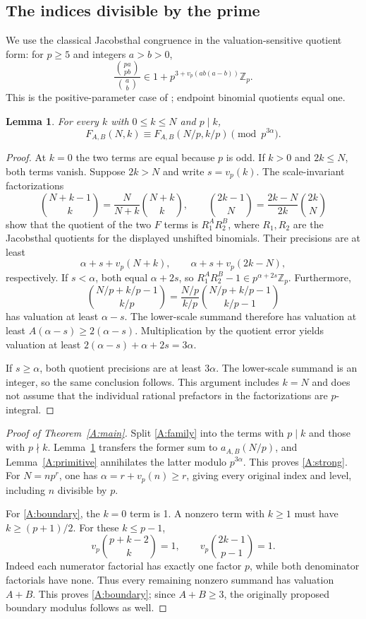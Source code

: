 \documentclass[11pt,a4paper]{article}
\newtheorem{lemma}[theorem]{Lemma}
\theoremstyle{remark}\newtheorem{remark}[theorem]{Remark}
\newcommand{\vp}{v_p}\newcommand{\Zp}{\mathbb Z_p}
\numberwithin{equation}{section}
\begin{document}
\subsection{The indices divisible by the prime}
We use the classical Jacobsthal congruence in the valuation-sensitive
quotient form: for $p\ge5$ and integers $a>b>0$,
\begin{equation}\label{A:jac}
\frac{\binom{pa}{pb}}{\binom ab}
\in1+p^{3+\vp(ab(a-b))}\Zp.
\end{equation}
This is the positive-parameter case of \cite[Lemma 5.1]{A:Straub};
endpoint binomial quotients equal one.

\begin{lemma}\label{A:divisible}
For every $k$ with $0\le k\le N$ and $p\mid k$,
\[
F_{A,B}(N,k)\equiv F_{A,B}(N/p,k/p)\pmod{p^{3\alpha}}.
\]
\end{lemma}
\begin{proof}
At $k=0$ the two terms are equal because $p$ is odd. If $k>0$ and
$2k\le N$, both terms vanish. Suppose $2k>N$ and write $s=\vp(k)$.
The scale-invariant factorizations
\[
\binom{N+k-1}{k}=\frac{N}{N+k}\binom{N+k}{k},\qquad
\binom{2k-1}{N}=\frac{2k-N}{2k}\binom{2k}{N}
\]
show that the quotient of the two $F$ terms is $R_1^A R_2^B$, where
$R_1,R_2$ are the Jacobsthal quotients for the displayed unshifted
binomials. Their precisions are at least
\[
\alpha+s+\vp(N+k),\qquad
\alpha+s+\vp(2k-N),
\]
respectively. If $s<\alpha$, both equal $\alpha+2s$, so
$R_1^AR_2^B-1\in p^{\alpha+2s}\Zp$.
Furthermore,
\[
\binom{N/p+k/p-1}{k/p}
=\frac{N/p}{k/p}\binom{N/p+k/p-1}{k/p-1}
\]
has valuation at least $\alpha-s$. The lower-scale summand therefore
has valuation at least $A(\alpha-s)\ge2(\alpha-s)$.
Multiplication by the quotient error yields valuation at least
$2(\alpha-s)+\alpha+2s=3\alpha$.

If $s\ge\alpha$, both quotient precisions are at least $3\alpha$.
The lower-scale summand is an integer, so the same conclusion follows.
This argument includes $k=N$ and does not assume that the individual
rational prefactors in the factorizations are $p$-integral.
\end{proof}

\begin{proof}[Proof of Theorem~\ref{A:main}]
Split \eqref{A:family} into the terms with $p\mid k$ and those with
$p\nmid k$. Lemma~\ref{A:divisible} transfers the former sum to
$a_{A,B}(N/p)$, and Lemma~\ref{A:primitive} annihilates the latter modulo
$p^{3\alpha}$. This proves \eqref{A:strong}.
For $N=np^r$, one has $\alpha=r+\vp(n)\ge r$, giving every original
index and level, including $n$ divisible by $p$.

For \eqref{A:boundary}, the $k=0$ term is 1. A nonzero term with
$k\ge1$ must have $k\ge(p+1)/2$. For these $k\le p-1$,
\[
\vp\binom{p+k-2}{k}=1,\qquad
\vp\binom{2k-1}{p-1}=1.
\]
Indeed each numerator factorial has exactly one factor $p$, while
both denominator factorials have none. Thus every remaining nonzero
summand has valuation $A+B$. This proves \eqref{A:boundary}; since
$A+B\ge3$, the originally proposed boundary modulus follows as well.
\end{proof}
\end{document}
